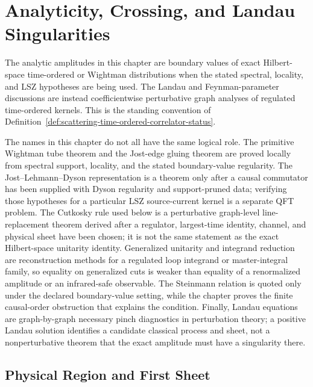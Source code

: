 \chapter{Analyticity, Crossing, and Landau Singularities}
\label{ch:volume-ii-analyticity-crossing-landau}
\ConventionsLorentzian

The analytic amplitudes in this chapter are boundary values of exact
Hilbert-space time-ordered or Wightman distributions when the stated
spectral, locality, and LSZ hypotheses are being used.  The Landau and
Feynman-parameter discussions are instead coefficientwise perturbative graph
analyses of regulated time-ordered kernels.  This is the standing convention
of Definition~\ref{def:scattering-time-ordered-correlator-status}.

\begin{remark}
\label{rem:chapter06-named-tool-status-ledger}
The names in this chapter do not all have the same logical role.  The
primitive Wightman tube theorem and the Jost-edge gluing theorem are proved
locally from spectral support, locality, and the stated boundary-value
regularity.  The Jost--Lehmann--Dyson representation is a theorem only after a
causal commutator has been supplied with Dyson regularity and support-pruned
data; verifying those hypotheses for a particular LSZ source-current kernel is
a separate QFT problem.  The Cutkosky rule used below is a perturbative
graph-level line-replacement theorem derived after a regulator, largest-time
identity, channel, and physical sheet have been chosen; it is not the same
statement as the exact Hilbert-space unitarity identity.  Generalized
unitarity and integrand reduction are reconstruction methods for a regulated
loop integrand or master-integral family, so equality on generalized cuts is
weaker than equality of a renormalized amplitude or an infrared-safe
observable.  The Steinmann relation is quoted only under the declared
boundary-value setting, while the chapter proves the finite causal-order
obstruction that explains the condition.  Finally, Landau equations are
graph-by-graph necessary pinch diagnostics in perturbation theory; a positive
Landau solution identifies a candidate classical process and sheet, not a
nonperturbative theorem that the exact amplitude must have a singularity
there.
\end{remark}


\section{Physical Region and First Sheet}
\label{sec:physical-region-and-first-sheet}

